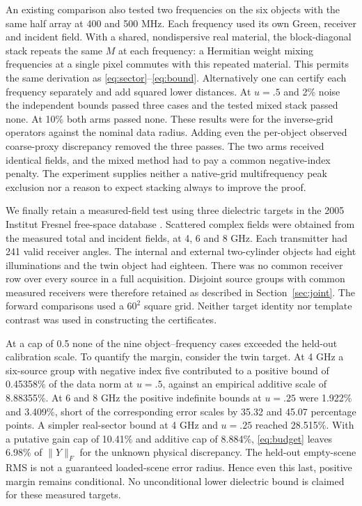 \documentclass[anonymous,12pt]{iopjournal}
\theoremstyle{remark}\newtheorem{remark}[theorem]{Remark}
\numberwithin{equation}{section}
\begin{document}
An existing comparison also tested two frequencies on the six objects with the same half array at 400 and 500 MHz. Each frequency used its own Green, receiver and incident field. With a shared, nondispersive real material, the block-diagonal stack repeats the same $M$ at each frequency: a Hermitian weight mixing frequencies at a single pixel commutes with this repeated material. This permits the same derivation as \eqref{eq:sector}--\eqref{eq:bound}. Alternatively one can certify each frequency separately and add squared lower distances. At $u=.5$ and 2\% noise the independent bounds passed three cases and the tested mixed stack passed none. At 10\% both arms passed none. These results were for the inverse-grid operators against the nominal data radius. Adding even the per-object observed coarse-proxy discrepancy removed the three passes. The two arms received identical fields, and the mixed method had to pay a common negative-index penalty. The experiment supplies neither a native-grid multifrequency peak exclusion nor a reason to expect stacking always to improve the proof.

We finally retain a measured-field test using three dielectric targets in the 2005 Institut Fresnel free-space database \cite{fresnel}. Scattered complex fields were obtained from the measured total and incident fields, at 4, 6 and 8 GHz. Each transmitter had 241 valid receiver angles. The internal and external two-cylinder objects had eight illuminations and the twin object had eighteen. There was no common receiver row over every source in a full acquisition. Disjoint source groups with common measured receivers were therefore retained as described in Section~\ref{sec:joint}. The forward comparisons used a $60^2$ square grid. Neither target identity nor template contrast was used in constructing the certificates.

At a cap of 0.5 none of the nine object--frequency cases exceeded the held-out calibration scale. To quantify the margin, consider the twin target. At 4 GHz a six-source group with negative index five contributed to a positive bound of 0.45358\% of the data norm at $u=.5$, against an empirical additive scale of 8.88355\%. At 6 and 8 GHz the positive indefinite bounds at $u=.25$ were 1.922\% and 3.409\%, short of the corresponding error scales by 35.32 and 45.07 percentage points. A simpler real-sector bound at 4 GHz and $u=.25$ reached 28.515\%. With a putative gain cap of 10.41\% and additive cap of 8.884\%, \eqref{eq:budget} leaves 6.98\% of $\|Y\|_F$ for the unknown physical discrepancy. The held-out empty-scene RMS is not a guaranteed loaded-scene error radius. Hence even this last, positive margin remains conditional. No unconditional lower dielectric bound is claimed for these measured targets.
\end{document}
